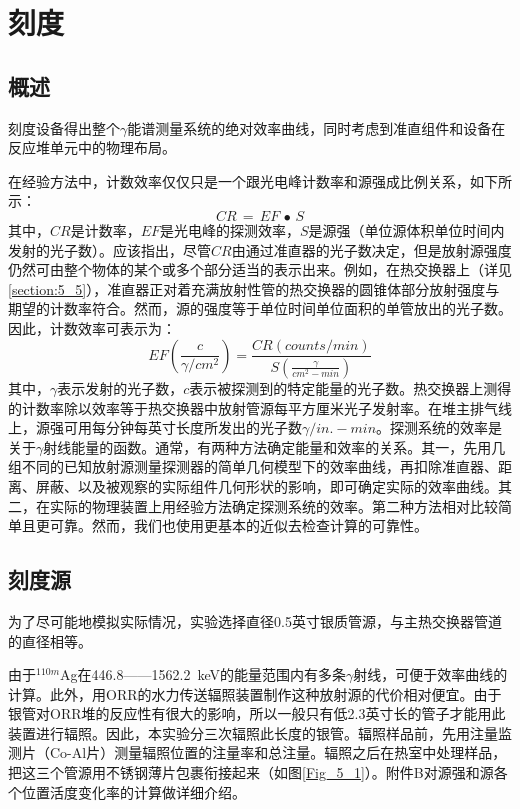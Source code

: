 \chapter{刻度}

\section{概述}

刻度设备得出整个$\gamma$能谱测量系统的绝对效率曲线，同时考虑到准直组件和设备在反应堆单元中的物理布局。

在经验方法中，计数效率仅仅只是一个跟光电峰计数率和源强成比例关系，如下所示：
\begin{equation}
\label{eq:equ1}
CR\,=\,EF\,\bullet\,S
\end{equation}
其中，$CR$是计数率，$EF$是光电峰的探测效率，$S$是源强（单位源体积单位时间内发射的光子数）。应该指出，尽管$CR$由通过准直器的光子数决定，但是放射源强度仍然可由整个物体的某个或多个部分适当的表示出来。例如，在热交换器上（详见\ref{section:5_5}），准直器正对着充满放射性管的热交换器的圆锥体部分放射强度与期望的计数率符合。然而，源的强度等于单位时间单位面积的单管放出的光子数。因此，计数效率可表示为：
\begin{equation}
\label{eq:equ1}
EF(\frac{c}{\gamma/cm^{2}})=\frac{CR(counts/min)}{S(\frac{\gamma}{cm^{2}-min})}
\end{equation}
其中，$\gamma$表示发射的光子数，$c$表示被探测到的特定能量的光子数。热交换器上测得的计数率除以效率等于热交换器中放射管源每平方厘米光子发射率。在堆主排气线上，源强可用每分钟每英寸长度所发出的光子数$\gamma/in.-min$。探测系统的效率是关于$\gamma$射线能量的函数。通常，有两种方法确定能量和效率的关系。其一，先用几组不同的已知放射源测量探测器的简单几何模型下的效率曲线，再扣除准直器、距离、屏蔽、以及被观察的实际组件几何形状的影响，即可确定实际的效率曲线。其二，在实际的物理装置上用经验方法确定探测系统的效率。第二种方法相对比较简单且更可靠。然而，我们也使用更基本的近似去检查计算的可靠性。

\section{刻度源}

为了尽可能地模拟实际情况，实验选择直径0.5英寸银质管源，与主热交换器管道的直径相等。

由于$^{110m}$Ag在446.8——1562.2\ keV的能量范围内有多条$\gamma$射线，可便于效率曲线的计算。此外，用ORR的水力传送辐照装置制作这种放射源的代价相对便宜。由于银管对ORR堆的反应性有很大的影响，所以一般只有低2.3英寸长的管子才能用此装置进行辐照。因此，本实验分三次辐照此长度的银管。辐照样品前，先用注量监测片（Co-Al片）测量辐照位置的注量率和总注量。辐照之后在热室中处理样品，把这三个管源用不锈钢薄片包裹衔接起来（如图\ref{Fig_5_1}）。附件B对源强和源各个位置活度变化率的计算做详细介绍。

